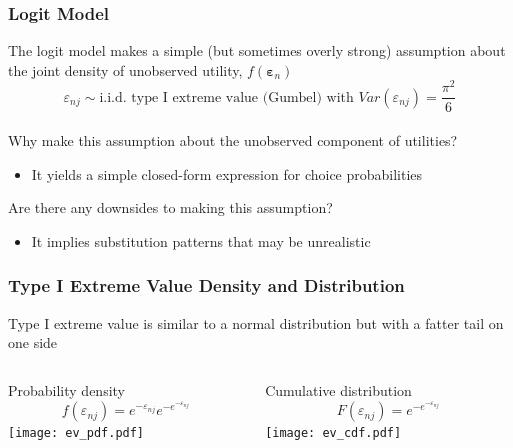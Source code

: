 \documentclass{beamer}\usepackage[]{graphicx}\usepackage[]{color}
\begin{document}
\begin{frame}\frametitle{Logit Model}
    The logit model makes a simple (but sometimes overly strong) assumption about the joint density of unobserved utility, $f(\bm{\varepsilon}_n)$
    $$\varepsilon_{nj} \sim \text{i.i.d.\ type I extreme value (Gumbel) with } Var(\varepsilon_{nj}) = \frac{\pi^2}{6}$$ \\
    \vspace{3ex}
    Why make this assumption about the unobserved component of utilities?
    \begin{itemize}
    	\item It yields a simple closed-form expression for choice probabilities
    \end{itemize}
    \vspace{3ex}
    Are there any downsides to making this assumption?
    \begin{itemize}
    	\item It implies substitution patterns that may be unrealistic
    \end{itemize}
\end{frame}

\begin{frame}\frametitle{Type I Extreme Value Density and Distribution}
    Type I extreme value is similar to a normal distribution but with a fatter tail on one side \\
    \begin{columns}
		\begin{column}{0.5\textwidth}
			\begin{center}
				Probability density
				$$f(\varepsilon_{nj}) = e^{-\varepsilon_{nj}} e^{-e^{-\varepsilon_{nj}}}$$
				\texttt{[image: ev\_pdf.pdf]}      
			\end{center}
		\end{column}
		\begin{column}{0.5\textwidth}
    		\begin{center}
     			Cumulative distribution 
     			$$F(\varepsilon_{nj}) = e^{-e^{-\varepsilon_{nj}}}$$
				\texttt{[image: ev\_cdf.pdf]}          
     		\end{center}
		\end{column}
	\end{columns}
\end{frame}
\end{document}
